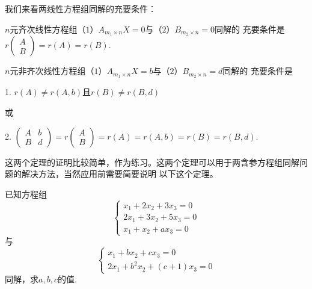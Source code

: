 我们来看两线性方程组同解的充要条件：
\begin{theorem}
	$n$元齐次线性方程组（$1$）$A_{m_1 \times n}X=0$与（$2$）$B_{m_2 \times n}=0$同解的
	充要条件是$r\begin{pmatrix}
		A \\ B
	\end{pmatrix}=r(A)=r(B)$.
\end{theorem}
\begin{theorem}
	$n$元非齐次线性方程组（$1$）$A_{m_1 \times n}X=b$与（$2$）$B_{m_2 \times n}=d$同解的
	充要条件是
	
	\textup{1. }$r(A)\neq r(A,b)$且$r(B)\neq r(B,d)$
	
	或
	
	\textup{2. }$\begin{pmatrix}
		A & b \\ B & d
	\end{pmatrix}=r\begin{pmatrix}
		A \\ B
	\end{pmatrix}=r(A)=r(A,b)=r(B)=r(B,d)$.
\end{theorem}
这两个定理的证明比较简单，作为练习。这两个定理可以用于两含参方程组同解问题的解决方法，当然应用前需要简要说明
以下这个定理。
\begin{example}
	已知方程组$$\begin{cases}
		x_1+2x_2+3x_3=0 \\ 2x_1+3x_2+5x_3=0 \\ x_1+x_2+ax_3=0
	\end{cases}$$
	与$$\begin{cases}
		x_1+bx_2+cx_3=0 \\ 2x_1+b^2x_2+(c+1)x_3=0
	\end{cases}$$
	同解，求$a,b,c$的值.
\end{example}
